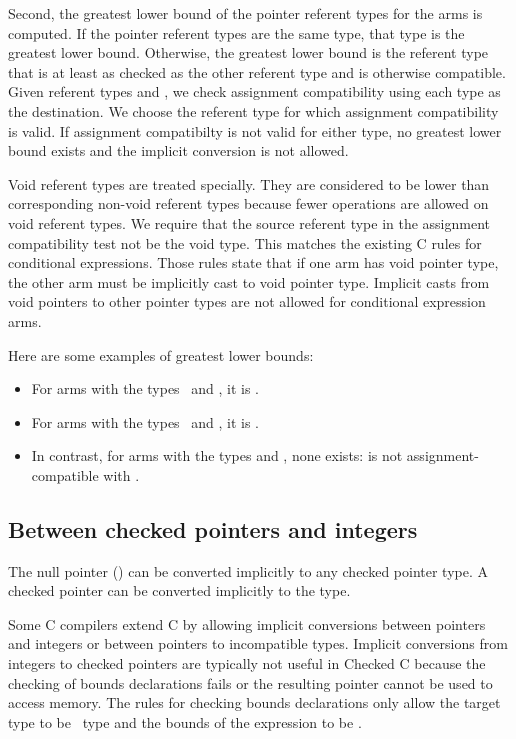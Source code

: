 Second, the greatest lower bound of the pointer referent types for the arms is computed.
If the pointer referent types are the same type, that type is the greatest lower bound.
Otherwise, the greatest lower bound is the referent type that is at least as checked as the
other referent type and is otherwise compatible.  Given referent types  and ,
we check assignment compatibility using each type as the destination.  We
choose the referent type for which assignment compatibility is valid.
If assignment compatibilty is not valid for either type, no greatest lower
bound exists and the implicit conversion is not allowed.

Void referent types are treated specially. They are considered to be lower than
corresponding non-void referent types because fewer operations are allowed on
void referent types. We require that the source referent
type in the assignment compatibility test not be the void type.
This matches the existing C rules for conditional expressions.  Those
rules state that if one arm has void pointer type, the other
arm must be implicitly cast to void pointer type.  Implicit casts from void pointers to other
pointer types are not allowed for conditional expression arms.

Here are some examples of greatest lower bounds:
\begin{itemize}
\item  For arms with the types \arrayptrint\ and \ptrint, it is \ptrint.
\item  For arms with the types \arrayptrvoid\ and ,
it is \arrayptrvoid.
\item In contrast, for arms with the types  and , none exists:
 is not assignment-compatible with .
\end{itemize}

\subsection{Between checked pointers and integers}

The null pointer () can be converted implicitly to any checked pointer type.
A checked pointer can be converted implicitly to the  type.

Some C compilers extend C by allowing implicit conversions between pointers
and integers or between pointers to incompatible types.  Implicit conversions
from integers to checked pointers are typically not useful in Checked C because
the checking of bounds declarations fails or the resulting pointer cannot
be used to access memory.   The rules for checking bounds declarations only
allow the target type to be \arrayptr\ type and the bounds of the expression to be
\boundsunknown.


